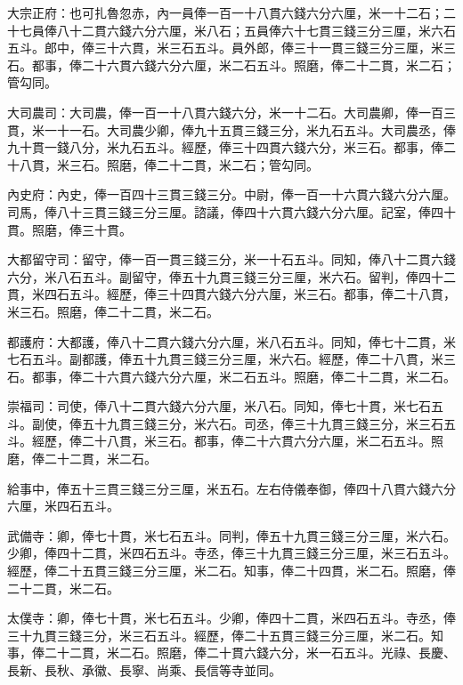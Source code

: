 \begin{pinyinscope}
 大宗正府：也可扎魯忽赤，內一員俸一百一十八貫六錢六分六厘，米一十二石；二十七員俸八十二貫六錢六分六厘，米八石；五員俸六十七貫三錢三分三厘，米六石五斗。郎中，俸三十六貫，米三石五斗。員外郎，俸三十一貫三錢三分三厘，米三石。都事，俸二十六貫六錢六分六厘，米二石五斗。照磨，俸二十二貫，米二石；管勾同。



 大司農司：大司農，俸一百一十八貫六錢六分，米一十二石。大司農卿，俸一百三貫，米一十一石。大司農少卿，俸九十五貫三錢三分，米九石五斗。大司農丞，俸九十貫一錢八分，米九石五斗。經歷，俸三十四貫六錢六分，米三石。都事，俸二十八貫，米三石。照磨，俸二十二貫，米二石；管勾同。



 內史府：內史，俸一百四十三貫三錢三分。中尉，俸一百一十六貫六錢六分六厘。司馬，俸八十三貫三錢三分三厘。諮議，俸四十六貫六錢六分六厘。記室，俸四十貫。照磨，俸三十貫。



 大都留守司：留守，俸一百一貫三錢三分，米一十石五斗。同知，俸八十二貫六錢六分，米八石五斗。副留守，俸五十九貫三錢三分三厘，米六石。留判，俸四十二貫，米四石五斗。經歷，俸三十四貫六錢六分六厘，米三石。都事，俸二十八貫，米三石。照磨，俸二十二貫，米二石。



 都護府：大都護，俸八十二貫六錢六分六厘，米八石五斗。同知，俸七十二貫，米七石五斗。副都護，俸五十九貫三錢三分三厘，米六石。經歷，俸二十八貫，米三石。都事，俸二十六貫六錢六分六厘，米二石五斗。照磨，俸二十二貫，米二石。



 崇福司：司使，俸八十二貫六錢六分六厘，米八石。同知，俸七十貫，米七石五斗。副使，俸五十九貫三錢三分，米六石。司丞，俸三十九貫三錢三分，米三石五斗。經歷，俸二十八貫，米三石。都事，俸二十六貫六分六厘，米二石五斗。照磨，俸二十二貫，米二石。



 給事中，俸五十三貫三錢三分三厘，米五石。左右侍儀奉御，俸四十八貫六錢六分六厘，米四石五斗。



 武備寺：卿，俸七十貫，米七石五斗。同判，俸五十九貫三錢三分三厘，米六石。少卿，俸四十二貫，米四石五斗。寺丞，俸三十九貫三錢三分三厘，米三石五斗。經歷，俸二十五貫三錢三分三厘，米二石。知事，俸二十四貫，米二石。照磨，俸二十二貫，米二石。



 太僕寺：卿，俸七十貫，米七石五斗。少卿，俸四十二貫，米四石五斗。寺丞，俸三十九貫三錢三分，米三石五斗。經歷，俸二十五貫三錢三分三厘，米二石。知事，俸二十二貫，米二石。照磨，俸二十貫六錢六分，米一石五斗。光祿、長慶、長新、長秋、承徽、長寧、尚乘、長信等寺並同。




\end{pinyinscope}
